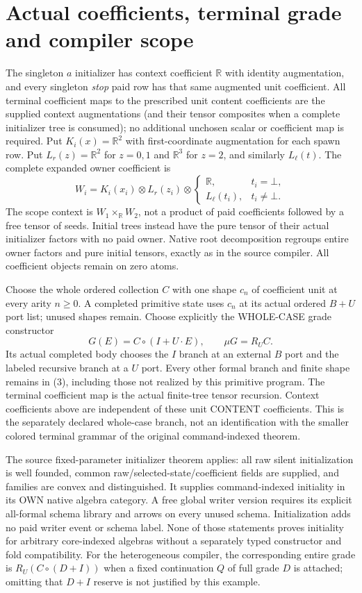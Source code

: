 \documentclass[11pt]{article}
\begin{document}
\section{Actual coefficients, terminal grade and compiler scope}
The singleton $a$ initializer has context coefficient $\mathbb R$ with identity augmentation, and every singleton \emph{stop} paid row has that same augmented unit coefficient. All terminal coefficient maps to the prescribed unit content coefficients are the supplied context augmentations (and their tensor composites when a complete initializer tree is consumed); no additional unchosen scalar or coefficient map is required. Put $K_i(x)=\mathbb R^2$ with first-coordinate augmentation for each spawn row. Put $L_r(z)=\mathbb R^2$ for $z=0,1$ and $\mathbb R^3$ for $z=2$, and similarly $L_\ell(t)$. The complete expanded owner coefficient is
\[
 W_i=K_i(x_i)\otimes L_r(z_i)\otimes
       \begin{cases}\mathbb R,&t_i=\bot,\\L_\ell(t_i),&t_i\ne\bot.\end{cases}
\]
The scope context is $W_1\times_{\mathbb R}W_2$, not a product of paid coefficients followed by a free tensor of seeds. Initial trees instead have the pure tensor of their actual initializer factors with no paid owner. Native root decomposition regroups entire owner factors and pure initial tensors, exactly as in the source compiler. All coefficient objects remain on zero atoms.

Choose the whole ordered collection $C$ with one shape $c_n$ of coefficient unit at every arity $n\ge0$. A completed primitive state uses $c_n$ at its actual ordered $B+U$ port list; unused shapes remain. Choose explicitly the WHOLE-CASE grade constructor
\[
 G(E)=C\circ(I+U\cdot E),\qquad \mu G=R_U C.             \tag{3}
\]
Its actual completed body chooses the $I$ branch at an external $B$ port and the labeled recursive branch at a $U$ port. Every other formal branch and finite shape remains in (3), including those not realized by this primitive program. The terminal coefficient map is the actual finite-tree tensor recursion. Context coefficients above are independent of these unit CONTENT coefficients. This is the separately declared whole-case branch, not an identification with the smaller colored terminal grammar of the original command-indexed theorem.

The source fixed-parameter initializer theorem applies: all raw silent initialization is well founded, common raw/selected-state/coefficient fields are supplied, and families are convex and distinguished. It supplies command-indexed initiality in its OWN native algebra category. A free global writer version requires its explicit all-formal schema library and arrows on every unused schema. Initialization adds no paid writer event or schema label. None of those statements proves initiality for arbitrary core-indexed algebras without a separately typed constructor and fold compatibility. For the heterogeneous compiler, the corresponding entire grade is $R_U(C\circ(D+I))$ when a fixed continuation $Q$ of full grade $D$ is attached; omitting that $D+I$ reserve is not justified by this example.
\end{document}
